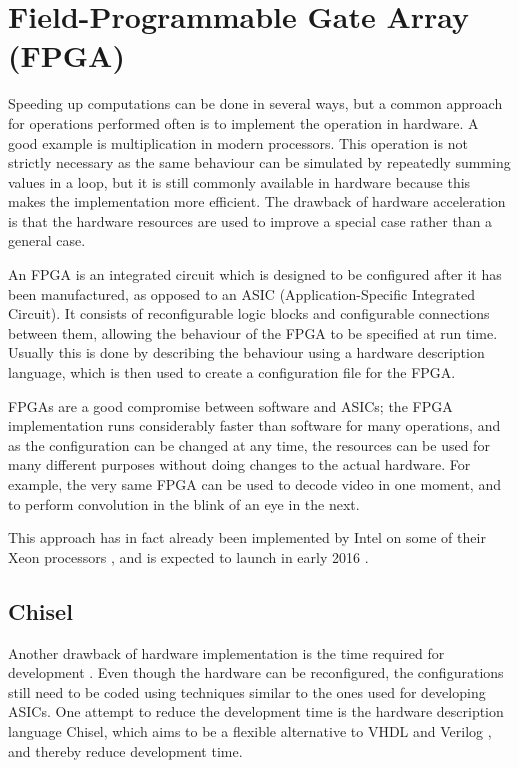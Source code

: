 \section{Field-Programmable Gate Array (FPGA)}
Speeding up computations can be done in several ways, but a common approach for operations performed often is to implement the operation in hardware.
A good example is multiplication in modern processors.
This operation is not strictly necessary as the same behaviour can be simulated by repeatedly summing values in a loop, but it is still commonly available in hardware because this makes the implementation more efficient.
The drawback of hardware acceleration is that the hardware resources are used to improve a special case rather than a general case.

An FPGA is an integrated circuit which is designed to be configured after it has been manufactured, as opposed to an ASIC (Application-Specific Integrated Circuit).
It consists of reconfigurable logic blocks and configurable connections between them, allowing the behaviour of the FPGA to be specified at run time. Usually this is done by describing the behaviour using a hardware description language, which is then used to create a configuration file for the FPGA.

FPGAs are a good compromise between software and ASICs; the FPGA implementation runs considerably faster than software for many operations, and as the configuration can be changed at any time, the resources can be used for many different purposes without doing changes to the actual hardware.
For example, the very same FPGA can be used to decode video in one moment, and to perform convolution in the blink of an eye in the next.

This approach has in fact already been implemented by Intel on some of their Xeon processors \cite{intelxeonfpga}, and is expected to launch in early 2016 \cite{PCWorldIntelFPGA}.

\subsection{Chisel}
\label{sec:chisel}
Another drawback of hardware implementation is the time required for development \cite{fpgaprosandcons}. 
Even though the hardware can be reconfigured, the configurations still need to be coded using techniques similar to the ones used for developing ASICs.
One attempt to reduce the development time is the hardware description language Chisel, which aims to be a flexible alternative to VHDL and Verilog \cite{chiselpaper}, and thereby reduce development time.
